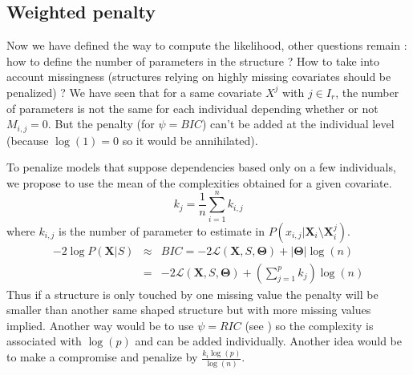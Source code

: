 \documentclass[12pt,a4paper]{report}
\begin{document}
%
%
	\subsection{Weighted penalty}
			Now we have defined the way to compute the likelihood, other questions remain : how to define the number of parameters in the structure ?		How to take into account missingness (structures relying on highly missing covariates should be penalized) ?
			We have seen that for a same covariate $X^j$ with $ j \in I_r$, the number of parameters is not the same for each individual depending whether or not $M_{i,j}=0$. But the penalty (for $\psi=BIC$) can't be added at the individual level (because $\log(1)=0$ so it would be annihilated). 
			
			To penalize models that suppose dependencies based only on a few individuals, we propose to use the mean of the complexities obtained for a given covariate.
			\begin{equation}
			k_j=\frac{1}{n}\sum_{i=1}^nk_{i,j}
\end{equation}						where $k_{i,j}$ is the number of parameter to estimate in $P(x_{i,j}|\boldsymbol{X}_i\setminus \boldsymbol{X}_i^j)$.
			\begin{eqnarray}
		-2\log P(\boldsymbol{X}|S)&\approx & BIC=-2\mathcal{L}(\boldsymbol{X},S,\boldsymbol{\Theta})+|\boldsymbol{\Theta}|\log(n) \\
		&=& -2\mathcal{L}(\boldsymbol{X},S,\boldsymbol{\Theta})+(\sum_{j=1}^pk_j)\log(n)
	\end{eqnarray}
			 Thus if a structure is only touched by one missing value the penalty will be smaller than another same shaped structure but with more missing values implied.
			Another way would be to use $\psi=RIC$ (see \cite{foster1994risk}) so the complexity is associated with $\log(p)$ and can be added individually. Another idea would be to make a compromise and penalize by $\frac{k_i\log(p)}{\log(n)}$.
		
\end{document}
